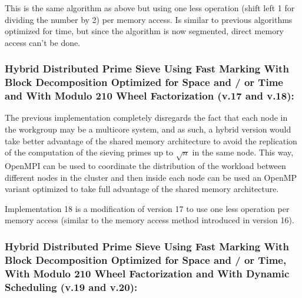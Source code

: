 \documentclass[runningheads,a4paper]{llncs}
\begin{document}
This is the same algorithm as above but using one less operation (shift left 1 for dividing the number by 2) per memory access. Is similar to previous algorithms optimized for time, but since the algorithm is now segmented, direct memory access can't be done.


\subsubsection{Hybrid Distributed Prime Sieve Using Fast Marking With Block Decomposition Optimized for Space and / or Time and With Modulo 210 Wheel Factorization (v.17 and v.18):}
\label{Hybrid Distributed Prime Sieve Using Fast Marking With Block Decomposition Optimized for Space and / or Time and With Modulo 210 Wheel Factorization}

The previous implementation completely disregards the fact that each node in the workgroup may be a multicore system, and as such, a hybrid version would take better advantage of the shared memory architecture to avoid the replication of the computation of the sieving primes up to $\sqrt{n}$ in the same node. This way, OpenMPI can be used to coordinate the distribution of the workload between different nodes in the cluster and then inside each node can be used an OpenMP variant optimized to take full advantage of the shared memory architecture.

Implementation 18 is a modification of version 17 to use one less operation per memory access (similar to the memory access method introduced in version 16).


\subsubsection{Hybrid Distributed Prime Sieve Using Fast Marking With Block Decomposition Optimized for Space and / or Time, With Modulo 210 Wheel Factorization and With Dynamic Scheduling (v.19 and v.20):}
\label{Hybrid Distributed Prime Sieve Using Fast Marking With Block Decomposition Optimized for Space and Time, With Modulo 210 Wheel Factorization and With Dynamic Scheduling}
\end{document}
